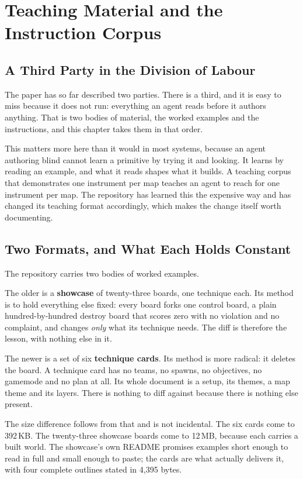 \chapter{Teaching Material and the Instruction Corpus}
\label{ch:teaching}

\section{A Third Party in the Division of Labour}

The paper has so far described two parties. There is a third, and it is easy to
miss because it does not run: everything an agent reads before it authors anything.
That is two bodies of material, the worked examples and the instructions, and this
chapter takes them in that order.

This matters more here than it would in most systems, because an agent authoring
blind cannot learn a primitive by trying it and looking. It learns by reading an
example, and what it reads shapes what it builds. A teaching corpus that
demonstrates one instrument per map teaches an agent to reach for one instrument
per map. The repository has learned this the expensive way and has changed its
teaching format accordingly, which makes the change itself worth documenting.

\section{Two Formats, and What Each Holds Constant}

The repository carries two bodies of worked examples.

The older is a \textbf{showcase} of twenty-three boards, one technique each. Its
method is to hold everything else fixed: every board forks one control board, a
plain hundred-by-hundred destroy board that scores zero with no violation and no
complaint, and changes \emph{only} what its technique needs. The diff is therefore
the lesson, with nothing else in it.

The newer is a set of six \textbf{technique cards}. Its method is more radical: it
deletes the board. A technique card has no teams, no spawns, no objectives, no
gamemode and no plan at all. Its whole document is a setup, its themes, a map theme
and its layers. There is nothing to diff against because there is nothing else
present.

The size difference follows from that and is not incidental. The six cards come to
392\,KB. The twenty-three showcase boards come to 12\,MB, because each carries a
built world. The showcase's own README promises examples short enough to read in
full and small enough to paste; the cards are what actually delivers it, with four
complete outlines stated in 4{,}395 bytes.

